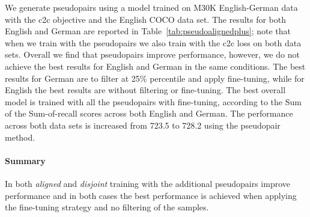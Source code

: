 We generate pseudopairs using a model trained on M30K English-German data with the c2c objective and the English
COCO data set. The results for both English and German are reported in Table~\ref{tab:pseudoalignedplus}; note that when we train with the pseudopairs we also train with the c2c loss on both data sets.  
Overall we find that pseudopairs 
improve performance, however, we do not achieve the 
best results for English and German in the same conditions. The best results for German are to filter at 25\% percentile and apply fine-tuning, 
while for English the best results are without filtering or fine-tuning. The best overall model is trained with
all the pseudopairs with fine-tuning, according to the Sum of the Sum-of-recall scores across 
both English and German.
The performance across both data sets is increased from 723.5 to 728.2 using the pseudopair method.

\paragraph{Summary}
In both \emph{aligned} and \emph{disjoint} training with the 
additional pseudopairs improve performance and in both cases the 
best performance is achieved when applying the 
fine-tuning strategy and no filtering of the samples.